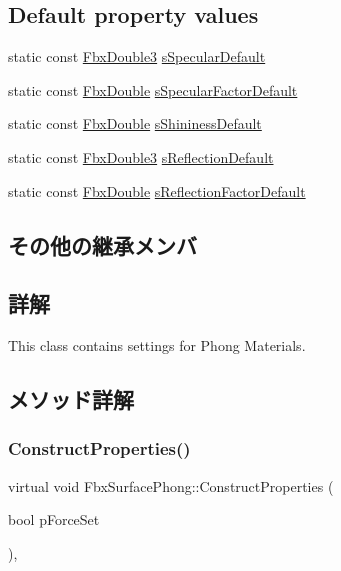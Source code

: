 \subsection*{Default property values}
\begin{DoxyCompactItemize}
\item 
static const \hyperlink{fbxtypes_8h_ae0a96f14cde566774c7553aa7523b7a7}{Fbx\+Double3} \hyperlink{class_fbx_surface_phong_ab42f5855747a5699e65b6dd6332b3f70}{s\+Specular\+Default}
\item 
static const \hyperlink{fbxtypes_8h_a171e72a1c46fc15c1a6c9c31948c1c5b}{Fbx\+Double} \hyperlink{class_fbx_surface_phong_a4906b3c1de363105b0e0c32be098b7a5}{s\+Specular\+Factor\+Default}
\item 
static const \hyperlink{fbxtypes_8h_a171e72a1c46fc15c1a6c9c31948c1c5b}{Fbx\+Double} \hyperlink{class_fbx_surface_phong_ad73d54cca213c728a5c5e88e74cf9bd3}{s\+Shininess\+Default}
\item 
static const \hyperlink{fbxtypes_8h_ae0a96f14cde566774c7553aa7523b7a7}{Fbx\+Double3} \hyperlink{class_fbx_surface_phong_a0513a220ce6a0cc31124637008b637bc}{s\+Reflection\+Default}
\item 
static const \hyperlink{fbxtypes_8h_a171e72a1c46fc15c1a6c9c31948c1c5b}{Fbx\+Double} \hyperlink{class_fbx_surface_phong_a7fa1d3af6e4814d255726194b6ebb968}{s\+Reflection\+Factor\+Default}
\end{DoxyCompactItemize}
\subsection*{その他の継承メンバ}


\subsection{詳解}
This class contains settings for Phong Materials. 

\subsection{メソッド詳解}
\mbox{\label{class_fbx_surface_phong_aa4262a042d35769e8ff745d408315bf9}} 
\subsubsection{\texorpdfstring{Construct\+Properties()}{ConstructProperties()}}
{\footnotesize\ttfamily virtual void Fbx\+Surface\+Phong\+::\+Construct\+Properties (\begin{DoxyParamCaption}\item[{bool}]{p\+Force\+Set }\end{DoxyParamCaption})\hspace{0.3cm}{\ttfamily [protected]}, {\ttfamily [virtual]}}

